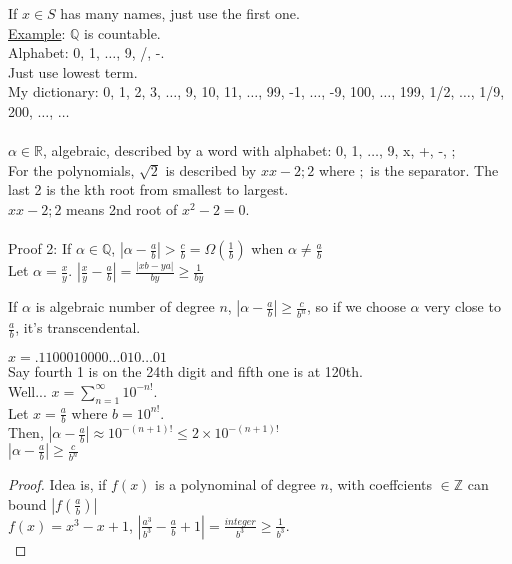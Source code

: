       If $x \in S$ has many names, just use the first one.\\
      \underline{Example}: $\mathbb{Q}$ is countable.\\
        Alphabet: 0, 1, $\ldots$, 9, /, -.\\
        Just use lowest term.\\
        My dictionary: 0, 1, 2, 3, $\ldots$, 9, 10, 11, $\ldots$, 99, -1, 
        $\ldots$, -9, 100, $\ldots$, 199, 1/2, $\ldots$, 1/9, 200, $\ldots$,
        $\ldots$\\\\
      $\alpha \in \mathbb{R}$, algebraic, described by a word with alphabet:
      0, 1, $\ldots$, 9, x, +, -, ;\\
      For the polynomials, $\sqrt{2}$ is described by $xx - 2; 2$ where $;$ is
      the separator. The last 2 is the kth root from smallest to largest.\\
      $xx - 2;2$ means 2nd root of $x^2 - 2 = 0$.\\\\
    Proof 2: If $\alpha \in \mathbb{Q}$, $|\alpha - \frac{a}{b}| > \frac{c}{b}
     = \Omega(\frac{1}{b})$ when $\alpha \not= \frac{a}{b}$\\
     Let $\alpha = \frac{x}{y}$. $|\frac{x}{y} - \frac{a}{b}| = \frac{|xb - ya|}
     {by} \ge \frac{1}{by}$\\
     \begin{theorem}
      If $\alpha$ is algebraic number of degree $n$, $|\alpha - \frac{a}{b}|
      \ge \frac{c}{b^n}$, so if we choose $\alpha$ very close to $\frac{a}{b}$,
      it's transcendental.
     \end{theorem}
     \begin{theorem}
      $x = .1100010000\ldots010\ldots01$\\
      Say fourth 1 is on the 24th digit and fifth one is at 120th.\\
      Well... $x = \sum_{n = 1}^{\infty} 10^{-n!}$.\\
      Let $x = \frac{a}{b}$ where $b = 10^{n!}$.\\
      Then, $|\alpha - \frac{a}{b}| \approx 10^{-(n+1)!} \le 2 \times 
      10^{-(n+1)!}$\\
      $|\alpha - \frac{a}{b}| \ge \frac{c}{b^n}$
     \end{theorem}
    \begin{proof}
      Idea is, if $f(x)$ is a polynominal of degree $n$, with coeffcients $\in
      \mathbb{Z}$ can bound $|f(\frac{a}{b})|$\\
      $f(x) = x^3 - x + 1$, $|\frac{a^3}{b^3} - \frac{a}{b} + 1| = 
      \frac{integer}{b^3} \ge \frac{1}{b^3}$.\\
    \end{proof}
